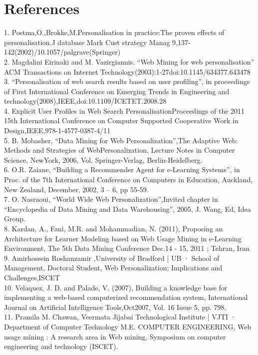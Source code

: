 \newpage
\chapter{References}

\renewcommand{\bibname}{References}

1.	Postma,O.,Brokke,M.Personalisation in practice:The proven effects of personalisation.J database Mark Cust strategy Manag 9,137-142(2002)/10.1057/palgrave(Springer)\\
2.	Magdalini Eirinaki and M. Vazirgiannis. “Web Mining for web personalisation” ACM Transactions on Internet Technology(2003):1-27doi:10.1145/634377.643478\\
3.	“Personalisation of web search results based on user profiling”, in proceedings of First International Conference on Emerging Trends in Engineering and technology(2008),IEEE,doi:10.1109/ICETET.2008.28\\
4.	Explicit User Profiles in Web Search PersonalisationProceedings of the 2011 15th International Conference on Computer Supported Cooperative Work in Design,IEEE,978-1-4577-0387-4/11 \\
5.	B. Mobasher, “Data Mining for Web Personalization”,The Adaptive Web: Methods and Strategies of WebPersonalization, Lecture Notes in Computer Science, NewYork, 2006, Vol. Springer-Verlag, Berlin-Heidelberg.\\
6.	O.R. Zaiane, “Building a Recommender Agent for e-Learning Systems”, in Proc. of the 7th International Conference on Computers in Education, Auckland, New Zealand, December, 2002, 3 – 6, pp 55-59.\\
7.	O. Nasraoui, “World Wide Web Personalization”,Invited chapter in “Encyclopedia of Data Mining and Data Warehousing”, 2005, J. Wang, Ed, Idea Group.\\
8.	Kardan, A., Fani, M.R. and Mohammadian, N. (2011), Proposing an Architecture for Learner Modeling based on Web Usage Mining in e-Learning Environment, The 5th Data Mining Conference Dec.14 - 15, 2011 ; Tehran, Iran\\
9.	Amirhossein Roshanzamir ,University of Bradford | UB · School of Management, Doctoral Student, Web Personalization; Implications and Challenges,ISCET\\
10.	Velaquez, J. D. and Palade, V. (2007), Building a knowledge base for implementing a web-based computerized recommendation system, International Journal on Artificial Intelligence Tools,Oct2007, Vol. 16 Issue 5, pp. 798.\\
11.	Pramila M. Chawan, Veermata Jijabai Technological Institute | VJTI · Department of Computer Technology M.E. COMPUTER ENGINEERING, Web usage mining : A research area in Web mining, Symposium on computer engineering and technology (ISCET).\\




 